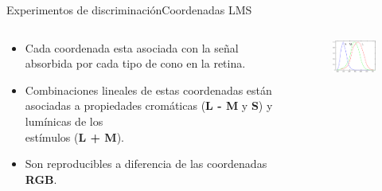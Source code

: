 \documentclass[
    11pt, %
    aspectratio=169, %
]{beamer}
\begin{document}
\begin{frame}{Experimentos de discriminación}{Coordenadas LMS}
    \begin{columns}[c] %

    
		\begin{column}{0.45\textwidth}

    \begin{itemize}
        \item Cada coordenada esta asociada con la señal absorbida por cada tipo de cono en la retina.
        \item Combinaciones lineales de estas coordenadas están asociadas a propiedades cromáticas (\textbf{L - M} y \textbf{S}) y lumínicas de los \\ estímulos (\textbf{L + M}).
        \item Son reproducibles a diferencia de las coordenadas \textbf{RGB}.
    \end{itemize}

          
 
               
		\end{column}
  		\begin{column}{0.55\textwidth} %
                 \begin{figure}[h!]
                    \centering
                    \includegraphics[angle=0, width=5.5cm]{Images/experimental/lms_coordinates.png}
                \end{figure}
		\end{column}		
	\end{columns}
\end{frame}
\end{document}
